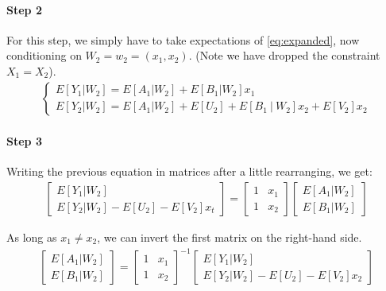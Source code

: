\paragraph{Step 2} For this step, we simply have to take expectations of \ref{eq:expanded}, now conditioning on $W_2 = w_2 = (x_1, x_2)$. (Note we have dropped the constraint $X_1 = X_2$).
\begin{align}
  \begin{cases}
      E[Y_{1}|W_{2}]
        = E[A_{1}|W_{2}] + E[B_{1}|W_{2}]x_{1} \\ 
      E[Y_{2}|W_{2}]
        = E[A_{1}|W_{2}] + E[U_{2}] + E[B_{1} \ | \ W_{2}]x_{2} + E[V_{2}]x_{2} 
  \end{cases}
\end{align}

\paragraph{Step 3} Writing the previous equation in matrices after a little rearranging, we get:
\begin{align}
  \begin{bmatrix}
    E[Y_{1}|W_{2}] \\  
    E[Y_{2}|W_{2}] - E[U_{2}] -  E[V_{2}]x_{t} 
  \end{bmatrix}
  =
  \begin{bmatrix}
    1 & x_1 \\
    1 & x_2  
  \end{bmatrix}
  \begin{bmatrix}
    E[A_{1}|W_{2}] \\
    E[B_{1}|W_{2}]
  \end{bmatrix}
\end{align}

\noindent As long as $x_1 \neq x_2$, we can invert the first matrix on the right-hand side. 
\begin{align}
  \begin{bmatrix}
    E[A_{1}|W_{2}] \\
    E[B_{1}|W_{2}]
  \end{bmatrix}
  =
  \begin{bmatrix}
    1 & x_1 \\
    1 & x_2  
  \end{bmatrix}^{-1}
  \begin{bmatrix}
    E[Y_{1}|W_{2}] \\  
    E[Y_{2}|W_{2}] - E[U_{2}] -  E[V_{2}]x_{2}  \label{eq:inversion}
  \end{bmatrix}
\end{align}

